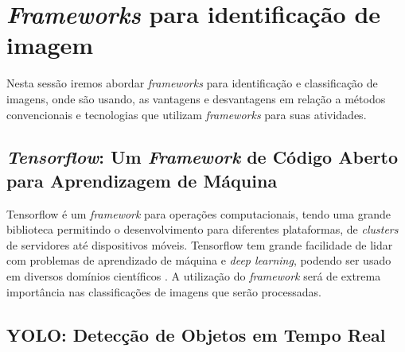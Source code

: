 \section{\textit{Frameworks} para identificação de imagem}

Nesta sessão iremos abordar \textit{frameworks} para identificação e classificação de imagens, onde são usando, as vantagens e desvantagens em  relação a métodos convencionais e tecnologias que utilizam \textit{frameworks} para suas atividades. %



\subsection{\textit{Tensorflow}: Um \textit{Framework} de Código Aberto para Aprendizagem de Máquina}

Tensorflow é um \textit{framework} para operações computacionais, tendo uma grande biblioteca permitindo o desenvolvimento para diferentes plataformas, de \textit{clusters} de servidores até dispositivos móveis. Tensorflow tem grande facilidade de lidar com problemas de aprendizado de máquina e \textit{deep learning}, podendo ser usado em diversos domínios científicos \cite{tensorflow2015}. A utilização do \textit{framework} será de extrema importância nas classificações de imagens que serão processadas.


\subsection{YOLO: Detecção de Objetos em Tempo Real}


